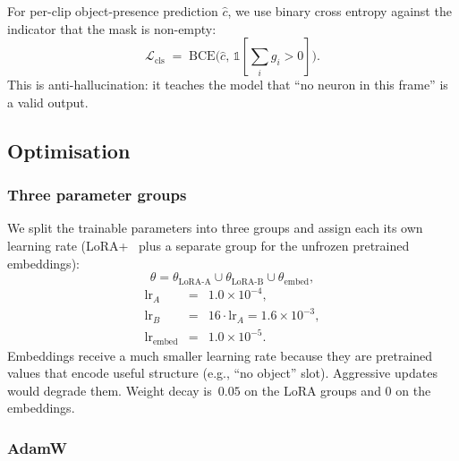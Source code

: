 \documentclass[11pt,a4paper]{article}
\begin{document}
For per-clip object-presence prediction $\hat{c}$, we use binary cross
entropy against the indicator that the mask is non-empty:
\begin{equation}
    \mathcal{L}_\text{cls} \;=\; \mathrm{BCE}\bigl(\hat{c},\,
        \mathbb{1}[\textstyle\sum_i g_i > 0]\bigr).
\end{equation}
This is anti-hallucination: it teaches the model that ``no neuron in
this frame'' is a valid output.

\subsection{Optimisation}

\subsubsection{Three parameter groups}

We split the trainable parameters into three groups and assign each its
own learning rate (LoRA+~\cite{loraplus} plus a separate group for the
unfrozen pretrained embeddings):
\begin{equation}
    \theta = \theta_\text{LoRA-A} \cup \theta_\text{LoRA-B} \cup \theta_\text{embed},
\end{equation}
\begin{equation}
\begin{array}{lll}
    \mathrm{lr}_A    &=& 1.0 \times 10^{-4}, \\
    \mathrm{lr}_B    &=& 16 \cdot \mathrm{lr}_A = 1.6 \times 10^{-3}, \\
    \mathrm{lr}_\text{embed} &=& 1.0 \times 10^{-5}.
\end{array}
\end{equation}
Embeddings receive a much smaller learning rate because they are
pretrained values that encode useful structure (e.g., ``no object''
slot). Aggressive updates would degrade them. Weight decay is~$0.05$
on the LoRA groups and $0$ on the embeddings.

\subsubsection{AdamW}
\end{document}

